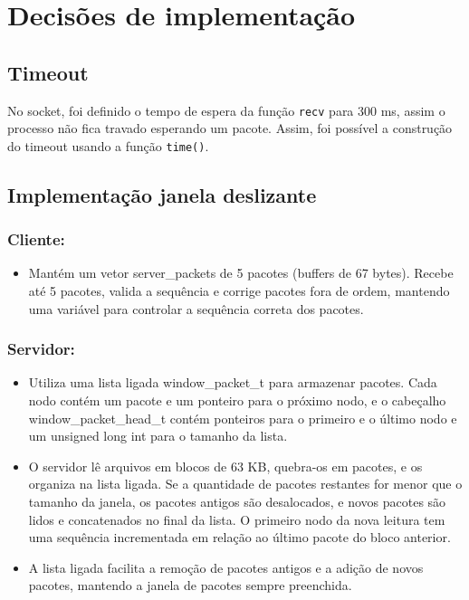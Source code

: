 \documentclass[a4paper, 12pt]{article}
\begin{document}
\section{Decisões de implementação}

\subsection{Timeout}
No socket, foi definido o tempo de espera
da função \texttt{recv} para 300 ms, assim o processo não fica travado esperando um pacote.
Assim, foi possível a construção do timeout usando a função \texttt{time()}.

\subsection{Implementação janela deslizante}

\subsubsection*{Cliente:}
\begin{itemize}
    \item Mantém um vetor server\_packets de 5 pacotes (buffers de 67 bytes).
Recebe até 5 pacotes, valida a sequência e corrige pacotes fora de ordem, mantendo
uma variável para controlar a sequência correta dos pacotes.
\end{itemize}

\subsubsection*{Servidor:}
\begin{itemize}
    \item Utiliza uma lista ligada window\_packet\_t para armazenar pacotes. Cada nodo contém um
    pacote e um ponteiro para o próximo nodo, e o cabeçalho window\_packet\_head\_t contém ponteiros
    para o primeiro e o último nodo e um unsigned long int para o tamanho da lista.

    \item O servidor lê arquivos em blocos de 63 KB, quebra-os em pacotes, e os organiza na lista 
    ligada. Se a quantidade de pacotes restantes for menor que o tamanho da janela, os pacotes antigos
    são desalocados, e novos pacotes são lidos e concatenados no final da lista. 
    O primeiro nodo da nova leitura tem uma sequência incrementada em relação ao último pacote 
    do bloco anterior.

    \item A lista ligada facilita a remoção de pacotes antigos e a adição de novos pacotes,
        mantendo a janela de pacotes sempre preenchida.
\end{itemize}
\end{document}
